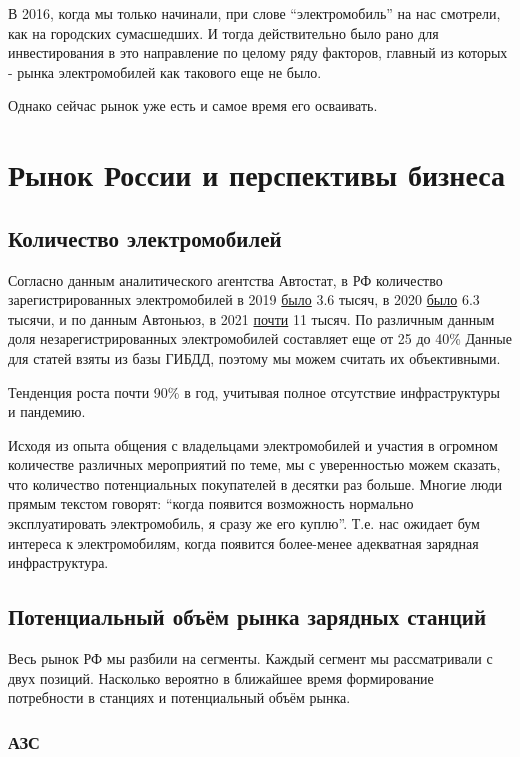 \documentclass[a4paper,12pt]{report}
\begin{document}
В 2016, когда мы только начинали, при слове “электромобиль” на нас смотрели, как на городских сумасшедших. И тогда действительно было рано для инвестирования в это направление по целому ряду факторов, главный из которых - рынка электромобилей как такового еще не было. 

Однако сейчас рынок уже есть и самое время его осваивать.  


\chapter{Рынок России и перспективы бизнеса}

\section{Количество электромобилей}

Согласно данным аналитического агентства Автостат, в РФ количество зарегистрированных электромобилей в 2019 \href{https://www.autostat.ru/news/38371/}{было} 3.6 тысяч, в 2020 \href{https://www.autostat.ru/news/42999/}{было} 6.3 тысячи, и по данным Автоньюз, в 2021 \href{https://www.autonews.ru/news/602002889a7947acbb3fd189}{почти} 11 тысяч. По различным данным доля незарегистрированных электромобилей составляет еще от 25 до 40\% Данные для статей взяты из базы ГИБДД, поэтому мы можем считать их объективными. 

Тенденция роста почти 90\% в год, учитывая полное отсутствие инфраструктуры и пандемию.

Исходя из опыта общения с владельцами электромобилей и участия в огромном количестве различных мероприятий по теме, мы с уверенностью можем сказать, что количество потенциальных покупателей в десятки раз больше. Многие люди прямым текстом говорят: “когда появится возможность нормально эксплуатировать электромобиль, я сразу же его куплю”. Т.е. нас ожидает бум интереса к электромобилям, когда появится более-менее адекватная зарядная инфраструктура. 

\section{Потенциальный объём рынка зарядных станций}

Весь рынок РФ мы разбили на сегменты. Каждый сегмент мы рассматривали с двух позиций. Насколько вероятно в ближайшее время формирование потребности в станциях и потенциальный объём рынка. 

\subsection{АЗС}
\end{document}
